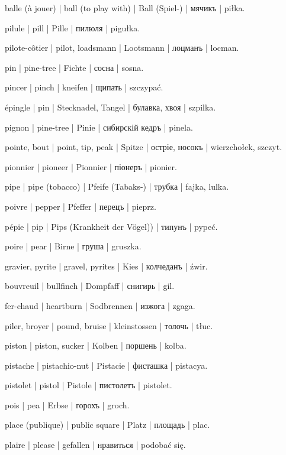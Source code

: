 \begin{outdent}{1em}
balle (à jouer) | ball (to play with) | Ball (Spiel-) | мячикъ | piłka.

pilule | pill | Pille | пилюля | pigułka.

pilote-côtier | pilot, loadsmann | Lootsmann | лоцманъ | locman.

pin | pine-tree | Fichte | сосна | sosna.

pincer | pinch | kneifen | щипать | szczypać.

épingle | pin | Stecknadel, Tangel | булавка, хвоя | szpilka.

pignon | pine-tree | Pinie | сибирскій кедръ | pinela.

pointe, bout | point, tip, peak | Spitze | остріе, носокъ | wierzchołek, szczyt.

pionnier | pioneer | Pionnier | піонеръ | pionier.

pipe | pipe (tobacco) | Pfeife (Tabaks-) | трубка | fajka,
lulka.

poivre | pepper | Pfeffer | перецъ | pieprz.

pépie | pip | Pips (Krankheit der Vögel)) | типунъ | pypeć.

poire | pear | Birne | груша | gruszka.

gravier, pyrite | gravel, pyrites | Kies | колчеданъ | źwir.

bouvreuil | bullfinch | Dompfaff | снигирь | gil.

fer-chaud | heartburn | Sodbrennen | изжога | zgaga.

piler, broyer | pound, bruise | kleinstossen | толочь | tłuc.

piston | piston, sucker | Kolben | поршень | kolba.

pistache | pistachio-nut | Pistacie | фисташка | pistacya.

pistolet | pistol | Pistole | пистолетъ | pistolet.

pois | pea | Erbse | горохъ | groch.

place (publique) | public square | Platz | площадь | plac.

plaire | please | gefallen | нравиться | podobać się.


\end{outdent}
